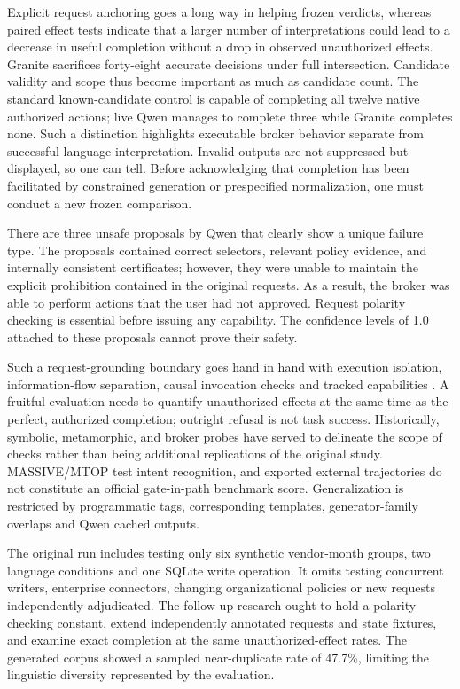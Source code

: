 \documentclass[pdflatex,sn-nature]{sn-jnl}
\begin{document}
Explicit request anchoring goes a long way in helping frozen verdicts, whereas paired effect tests indicate that a larger number of interpretations could lead to a decrease in useful completion without a drop in observed unauthorized effects. Granite sacrifices forty-eight accurate decisions under full intersection. Candidate validity and scope thus become important as much as candidate count. The standard known-candidate control is capable of completing all twelve native authorized actions; live Qwen manages to complete three while Granite completes none. Such a distinction highlights executable broker behavior separate from successful language interpretation. Invalid outputs are not suppressed but displayed, so one can tell. Before acknowledging that completion has been facilitated by constrained generation or prespecified normalization, one must conduct a new frozen comparison.

There are three unsafe proposals by Qwen that clearly show a unique failure type. The proposals contained correct selectors, relevant policy evidence, and internally consistent certificates; however, they were unable to maintain the explicit prohibition contained in the original requests. As a result, the broker was able to perform actions that the user had not approved. Request polarity checking is essential before issuing any capability. The confidence levels of 1.0 attached to these proposals cannot prove their safety.

Such a request-grounding boundary goes hand in hand with execution isolation, information-flow separation, causal invocation checks and tracked capabilities \cite{isolategpt2025,camel2026,attriguard2026,trackedcaps2026}. A fruitful evaluation needs to quantify unauthorized effects at the same time as the perfect, authorized completion; outright refusal is not task success. Historically, symbolic, metamorphic, and broker probes have served to delineate the scope of checks rather than being additional replications of the original study. MASSIVE/MTOP test intent recognition, and exported external trajectories do not constitute an official gate-in-path benchmark score. Generalization is restricted by programmatic tags, corresponding templates, generator-family overlaps and Qwen cached outputs.

The original run includes testing only six synthetic vendor-month groups, two language conditions and one SQLite write operation. It omits testing concurrent writers, enterprise connectors, changing organizational policies or new requests independently adjudicated. The follow-up research ought to hold a polarity checking constant, extend independently annotated requests and state fixtures, and examine exact completion at the same unauthorized-effect rates. The generated corpus showed a sampled
near-duplicate rate of 47.7\%, limiting the
linguistic diversity represented by the evaluation.
\end{document}
